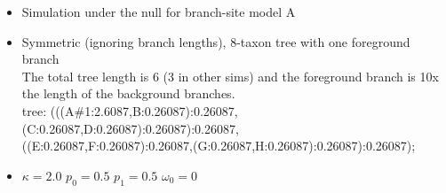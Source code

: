 \documentclass[12pt,letterpaper]{article}\usepackage[]{graphicx}\usepackage[]{color}
\newenvironment{knitrout}{}{} %
\begin{document}
\begin{itemize}
\item Simulation under the null for branch-site model A
\item Symmetric (ignoring branch lengths), 8-taxon tree with one foreground branch\\
  The total tree length is 6 (3 in other sims) and the foreground branch is 10x the length of the background branches.\\
  tree: (((A\#1:2.6087,B:0.26087):0.26087,(C:0.26087,D:0.26087):0.26087):0.26087,\\((E:0.26087,F:0.26087):0.26087,(G:0.26087,H:0.26087):0.26087):0.26087);
\item $\kappa=2.0$ $p_0=0.5$ $p_1=0.5$ $\omega_0=0$
\end{itemize}

\begin{knitrout}
\color{fgcolor}


\end{knitrout}
\end{document}
